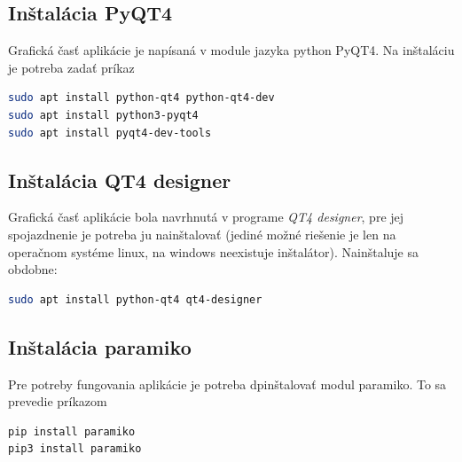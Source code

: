 \subsection{Inštalácia PyQT4}
Grafická časť aplikácie je napísaná v module jazyka python PyQT4. Na inštaláciu je potreba zadať príkaz
\begin{lstlisting}[language=bash, frame=single, caption=Nainštalovanie pyqt4,captionpos=b, showstringspaces=false]
sudo apt install python-qt4 python-qt4-dev
sudo apt install python3-pyqt4
sudo apt install pyqt4-dev-tools
\end{lstlisting}
\subsection{Inštalácia QT4 designer}
Grafická časť aplikácie bola navrhnutá v programe \textit{QT4 designer}, pre jej spojazdnenie je potreba ju nainštalovať (jediné možné riešenie je len na operačnom systéme linux, na windows neexistuje inštalátor). Nainštaluje sa obdobne:
\begin{lstlisting}[language=bash, frame=single, caption=Nainštalovanie qt4 designera,captionpos=b, showstringspaces=false]
sudo apt install python-qt4 qt4-designer
\end{lstlisting}
\subsection{Inštalácia paramiko}
Pre potreby fungovania aplikácie je potreba dpinštalovať modul paramiko. To sa prevedie príkazom
\begin{lstlisting}[language=bash, frame=single, caption=Inštalácia paramiko,captionpos=b, showstringspaces=false]
pip install paramiko
pip3 install paramiko
\end{lstlisting}
